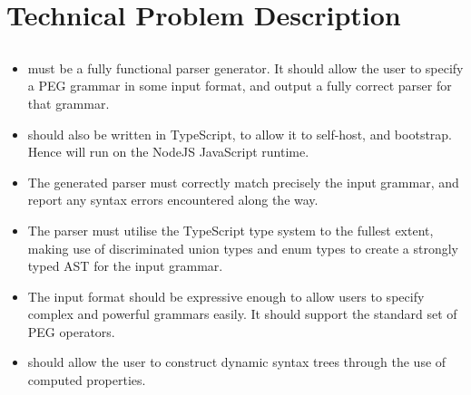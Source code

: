 \chapter{Technical Problem Description}
\section{\tsPEG{}}
 \begin{itemize}
     \item \tsPEG{} must be a fully functional parser generator. It should allow the user to specify a PEG grammar in some input format, and output a fully correct parser for that grammar.
 
     \item \tsPEG{} should also be written in TypeScript, to allow it to self-host, and bootstrap. Hence \tsPEG{} will run on the NodeJS JavaScript runtime.
 
     \item The generated parser must correctly match precisely the input grammar, and report any syntax errors encountered along the way.
 
     \item The parser must utilise the TypeScript type system to the fullest extent, making use of discriminated union types and enum types to create a strongly typed AST for the input grammar.
 
     \item The \tsPEG{} input format should be expressive enough to allow users to specify complex and powerful grammars easily. It should support the standard set of PEG operators.

     \item \tsPEG{} should allow the user to construct dynamic syntax trees through the use of computed properties.
 \end{itemize}

\section{\Setanta{}}

